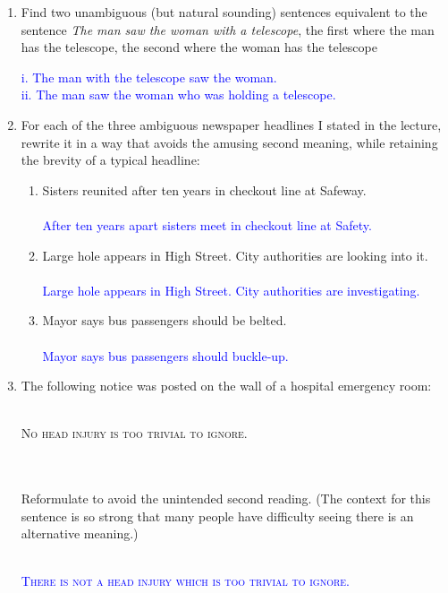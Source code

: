 \documentclass[13.5pt]{article}
\begin{document}
\begin{enumerate}
\item{Find two unambiguous (but natural sounding) sentences equivalent to the sentence \textit{The man saw the woman with a telescope}, the first where the man has the telescope, the second where the woman
has the telescope}\\

\begin{enumerate} 
  \textcolor{blue}{i. The man with the telescope saw the woman.}\\
  \textcolor{blue}{ii. The man saw the woman who was holding a telescope.} 
\end{enumerate}

\item{For each of the three ambiguous newspaper headlines I stated in the lecture, rewrite it in a way
that avoids the amusing second meaning, while retaining the brevity of a typical headline:
}
\begin{enumerate}
\item{Sisters reunited after ten years in checkout line at Safeway.}\\\\
\textcolor{blue}{After ten years apart sisters meet in checkout line at Safety.}\\
\item{Large hole appears in High Street. City authorities are looking into it.}\\\\
\textcolor{blue}{Large hole appears in High Street. City authorities are investigating.}\\
\item{Mayor says bus passengers should be belted.}\\\\
\textcolor{blue}{Mayor says bus passengers should buckle-up.}\\
\end{enumerate}

\item{The following notice was posted on the wall of a hospital emergency room:}\\\\
\centerline{\textsc{No head injury is too trivial to ignore.}}\\\\
{Reformulate to avoid the unintended second reading. (The context for this sentence is so strong that many people have difficulty seeing there is an alternative meaning.)}\\\\
\textcolor{blue}{\centerline{\textsc{There is not a head injury which is too trivial to ignore.}}}


\end{enumerate}
\end{document}

